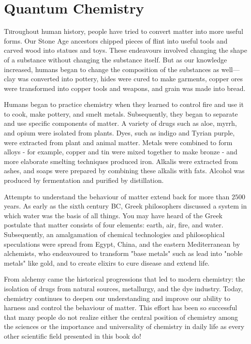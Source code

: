 	\newpage
	\thispagestyle{empty}
	\mbox{}
	\section{Quantum Chemistry}
	\lettrine[lines=4]{\color{BrickRed}T}hroughout human history, people have tried to convert matter into more useful forms. Our Stone Age ancestors chipped pieces of flint into useful tools and carved wood into statues and toys. These endeavours involved changing the shape of a substance without changing the substance itself. But as our knowledge increased, humans began to change the composition of the substances as well—clay was converted into pottery, hides were cured to make garments, copper ores were transformed into copper tools and weapons, and grain was made into bread.

	Humans began to practice chemistry when they learned to control fire and use it to cook, make pottery, and smelt metals. Subsequently, they began to separate and use specific components of matter. A variety of drugs such as aloe, myrrh, and opium were isolated from plants. Dyes, such as indigo and Tyrian purple, were extracted from plant and animal matter. Metals were combined to form alloys - for example, copper and tin were mixed together to make bronze - and more elaborate smelting techniques produced iron. Alkalis were extracted from ashes, and soaps were prepared by combining these alkalis with fats. Alcohol was produced by fermentation and purified by distillation.

	Attempts to understand the behaviour of matter extend back for more than $2500$ years. As early as the sixth century BC, Greek philosophers discussed a system in which water was the basis of all things. You may have heard of the Greek postulate that matter consists of four elements: earth, air, fire, and water. Subsequently, an amalgamation of chemical technologies and philosophical speculations were spread from Egypt, China, and the eastern Mediterranean by alchemists, who endeavoured to transform "base metals" such as lead into "noble metals" like gold, and to create elixirs to cure disease and extend life.

	From alchemy came the historical progressions that led to modern chemistry: the isolation of drugs from natural sources, metallurgy, and the dye industry. Today, chemistry continues to deepen our understanding and improve our ability to harness and control the behaviour of matter. This effort has been so successful that many people do not realize either the central position of chemistry among the sciences or the importance and universality of chemistry in daily life as every other scientific field presented in this book do!
	
